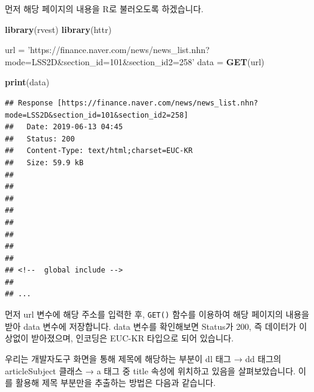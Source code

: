 \documentclass[]{book}
\newenvironment{Shaded}{\begin{snugshade}}{\end{snugshade}}
\newcommand{\DataTypeTok}[1]{\textcolor[rgb]{0.13,0.29,0.53}{#1}}
\newcommand{\KeywordTok}[1]{\textcolor[rgb]{0.13,0.29,0.53}{\textbf{#1}}}
\newcommand{\NormalTok}[1]{#1}
\newcommand{\OperatorTok}[1]{\textcolor[rgb]{0.81,0.36,0.00}{\textbf{#1}}}
\newcommand{\StringTok}[1]{\textcolor[rgb]{0.31,0.60,0.02}{#1}}
\begin{document}
먼저 해당 페이지의 내용을 R로 불러오도록 하겠습니다.

\begin{Shaded}
\begin{Highlighting}[]
\KeywordTok{library}\NormalTok{(rvest)}
\KeywordTok{library}\NormalTok{(httr)}

\NormalTok{url =}\StringTok{ 'https://finance.naver.com/news/news_list.nhn?mode=LSS2D&section_id=101&section_id2=258'}
\NormalTok{data =}\StringTok{ }\KeywordTok{GET}\NormalTok{(url)}

\KeywordTok{print}\NormalTok{(data)}
\end{Highlighting}
\end{Shaded}

\begin{verbatim}
## Response [https://finance.naver.com/news/news_list.nhn?mode=LSS2D&section_id=101&section_id2=258]
##   Date: 2019-06-13 04:45
##   Status: 200
##   Content-Type: text/html;charset=EUC-KR
##   Size: 59.9 kB
## 
## 
## 
## 
## 
## 
## 
## 
## <!--  global include -->
## 
## ...
\end{verbatim}

먼저 url 변수에 해당 주소를 입력한 후, \texttt{GET()} 함수를 이용하여 해당 페이지의 내용을 받아 data 변수에 저장합니다. data 변수를 확인해보면 Status가 200, 즉 데이터가 이상없이 받아졌으며, 인코딩은 EUC-KR 타입으로 되어 있습니다.

우리는 개발자도구 화면을 통해 제목에 해당하는 부분이 dl 태그 → dd 태그의 articleSubject 클래스 → a 태그 중 title 속성에 위치하고 있음을 살펴보았습니다. 이를 활용해 제목 부분만을 추출하는 방법은 다음과 같습니다.

\begin{Shaded}
\end{Shaded}
\end{document}

